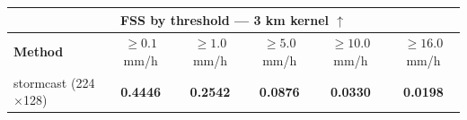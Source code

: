 \documentclass[border=10pt]{standalone}
\begin{document}
\begin{tabular}{lccccc}
\toprule
\multicolumn{6}{c}{\textbf{FSS by threshold — 3 km kernel} $\uparrow$} \\
\midrule
\textbf{Method} & $\geq 0.1$ mm/h & $\geq 1.0$ mm/h & $\geq 5.0$ mm/h & $\geq 10.0$ mm/h & $\geq 16.0$ mm/h \\
\midrule
stormcast (224$\times$128) & \textbf{0.4446} & \textbf{0.2542} & \textbf{0.0876} & \textbf{0.0330} & \textbf{0.0198} \\
\bottomrule
\end{tabular}
\end{document}
